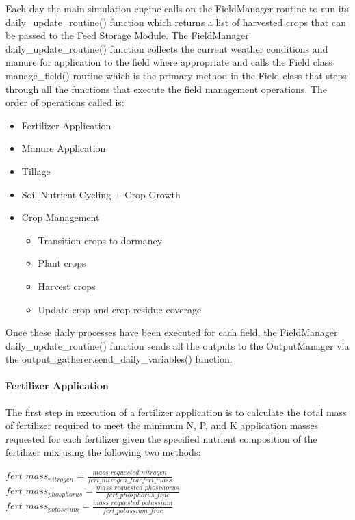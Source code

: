 Each day the main simulation engine calls on the FieldManager routine to run its daily\_update\_routine() function which returns a list of harvested crops that can be passed to the Feed Storage Module. The FieldManager daily\_update\_routine() function collects the current weather conditions and manure for application to the field where appropriate and calls the Field class manage\_field() routine which is the primary method in the Field class that steps through all the functions that execute the field management operations. The order of operations called is:
\begin{itemize}
    \item Fertilizer Application
    \item Manure Application
    \item Tillage
    \item Soil Nutrient Cycling + Crop Growth
    \item Crop Management
    \begin{itemize}
        \item Transition crops to dormancy
        \item Plant crops
        \item Harvest crops
        \item Update crop and crop residue coverage
    \end{itemize}
\end{itemize}


Once these daily processes have been executed for each field, the FieldManager daily\_update\_routine() function sends all the outputs to the OutputManager via the output\_gatherer.send\_daily\_variables() function. 

\paragraph{Fertilizer Application}
\vspace{-0.25cm}

The first step in execution of a fertilizer application is to calculate the total mass of fertilizer required to meet the minimum N, P, and K application masses requested for each fertilizer given the specified nutrient composition of the fertilizer mix using the following two methods:
            \vspace{0.5cm}        
    
    \begin{center}
        \(fert\_mass_{nitrogen}=\frac{mass\_requested\_nitrogen}{fert\_nitrogen\_frac
fert\_mass}\) \\ 
        \(fert\_mass_{phosphorus}=\frac{mass\_requested\_phosphorus}{fert\_phosphorus\_frac}\) \\
        \(fert\_mass_{potassium}=\frac{mass\_requested\_potassium}{fert\_potassium\_frac}\)
    \end{center}
        \vspace{0.5cm} 
    
